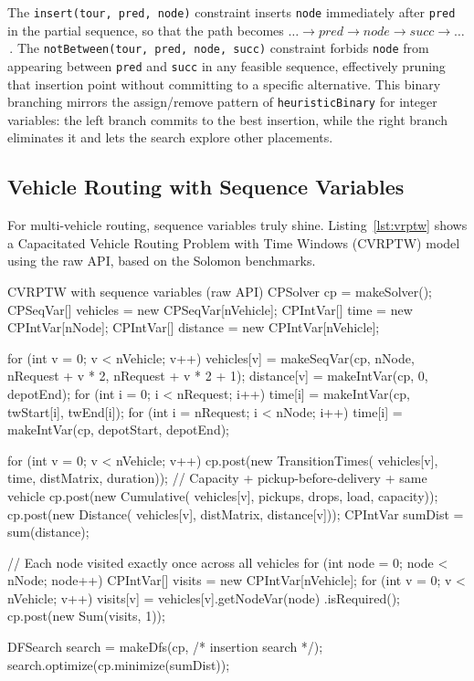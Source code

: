 \documentclass[11pt, a4paper]{scrartcl}
\begin{document}
The \texttt{insert(tour, pred, node)} constraint inserts \texttt{node} immediately after \texttt{pred} in the partial sequence, so that the path becomes $\ldots \to \mathit{pred} \to \mathit{node} \to \mathit{succ} \to \ldots$\,.
The \texttt{notBetween(tour, pred, node, succ)} constraint forbids \texttt{node} from appearing between \texttt{pred} and \texttt{succ} in any feasible sequence, effectively pruning that insertion point without committing to a specific alternative.
This binary branching mirrors the assign/remove pattern of \texttt{heuristicBinary} for integer variables: the left branch commits to the best insertion, while the right branch eliminates it and lets the search explore other placements.

\subsection{Vehicle Routing with Sequence Variables}

For multi-vehicle routing, sequence variables truly shine. Listing~\ref{lst:vrptw} shows a Capacitated Vehicle Routing Problem with Time Windows (CVRPTW) model using the raw API, based on the Solomon benchmarks.

\begin{codebox}[label={lst:vrptw}]{CVRPTW with sequence variables (raw API)}
CPSolver cp = makeSolver();
CPSeqVar[] vehicles = new CPSeqVar[nVehicle];
CPIntVar[] time = new CPIntVar[nNode];
CPIntVar[] distance = new CPIntVar[nVehicle];

for (int v = 0; v < nVehicle; v++) {
    vehicles[v] = makeSeqVar(cp, nNode,
        nRequest + v * 2, nRequest + v * 2 + 1);
    distance[v] = makeIntVar(cp, 0, depotEnd);
}
for (int i = 0; i < nRequest; i++)
    time[i] = makeIntVar(cp, twStart[i], twEnd[i]);
for (int i = nRequest; i < nNode; i++)
    time[i] = makeIntVar(cp, depotStart, depotEnd);

for (int v = 0; v < nVehicle; v++) {
    cp.post(new TransitionTimes(
        vehicles[v], time, distMatrix, duration));
    // Capacity + pickup-before-delivery + same vehicle
    cp.post(new Cumulative(
        vehicles[v], pickups, drops, load, capacity));
    cp.post(new Distance(
        vehicles[v], distMatrix, distance[v]));
}
CPIntVar sumDist = sum(distance);

// Each node visited exactly once across all vehicles
for (int node = 0; node < nNode; node++) {
    CPIntVar[] visits = new CPIntVar[nVehicle];
    for (int v = 0; v < nVehicle; v++)
        visits[v] = vehicles[v].getNodeVar(node)
                                .isRequired();
    cp.post(new Sum(visits, 1));
}

DFSearch search = makeDfs(cp, /* insertion search */);
search.optimize(cp.minimize(sumDist));
\end{codebox}
\end{document}

